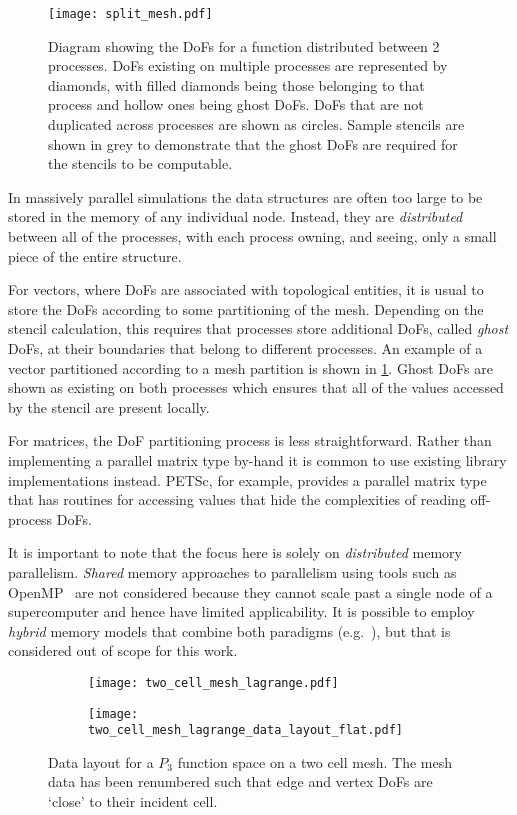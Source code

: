 \documentclass[thesis]{subfiles}
\begin{document}
\begin{figure}
  \centering
  \texttt{[image: split\_mesh.pdf]}
  \caption{
    Diagram showing the DoFs for a function distributed between 2 processes.
    DoFs existing on multiple processes are represented by diamonds, with filled diamonds being those belonging to that process and hollow ones being ghost DoFs.
    DoFs that are not duplicated across processes are shown as circles.
    Sample stencils are shown in grey to demonstrate that the ghost DoFs are required for the stencils to be computable.
  }
  \label{fig:pyop2_split_mesh}
\end{figure}

In massively parallel simulations the data structures are often too large to be stored in the memory of any individual node.
Instead, they are \emph{distributed} between all of the processes, with each process owning, and seeing, only a small piece of the entire structure.

For vectors, where DoFs are associated with topological entities, it is usual to store the DoFs according to some partitioning of the mesh.
Depending on the stencil calculation, this requires that processes store additional DoFs, called \emph{ghost} DoFs, at their boundaries that belong to different processes.
An example of a vector partitioned according to a mesh partition is shown in \cref{fig:pyop2_split_mesh}.
Ghost DoFs are shown as existing on both processes which ensures that all of the values accessed by the stencil are present locally.

For matrices, the DoF partitioning process is less straightforward.
Rather than implementing a parallel matrix type by-hand it is common to use existing library implementations instead.
PETSc, for example, provides a parallel matrix type that has routines for accessing values that hide the complexities of reading off-process DoFs.

It is important to note that the focus here is solely on \emph{distributed} memory parallelism.
\emph{Shared} memory approaches to parallelism using tools such as OpenMP~\cite{openmparchitecturereviewboardOpenMPAPISpecification2024} are not considered because they cannot scale past a single node of a supercomputer and hence have limited applicability.
It is possible to employ \emph{hybrid} memory models that combine both paradigms (e.g.~\cite{10.1007/978-3-642-38750-0_8}), but that is considered out of scope for this work.

\begin{figure}
  \centering
  \begin{subfigure}{\textwidth}
    \centering
    \texttt{[image: two\_cell\_mesh\_lagrange.pdf]}
    \vspace{1em}
  \end{subfigure}
  \begin{subfigure}{\textwidth}
    \centering
    \texttt{[image: two\_cell\_mesh\_lagrange\_data\_layout\_flat.pdf]}
  \end{subfigure}
  \caption{
    Data layout for a $P_3$ function space on a two cell mesh.
    The mesh data has been renumbered such that edge and vertex DoFs are `close' to their incident cell.
  }
  \label{fig:mesh_renumbering_demo}
\end{figure}
\end{document}
